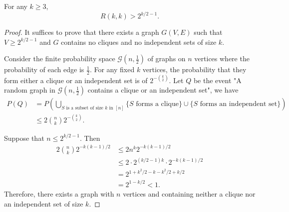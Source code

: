 \begin{theorem}
For any $k\ge 3$, 
$$
R(k,k) > 2^{k/2-1}.
$$
\end{theorem}
\begin{proof}
It suffices to prove that there exists a graph $G(V,E)$ such that $V\ge 2^{k/2-1}$ and $G$ contains no cliques and no independent sets of size $k$. 

Consider the finite probability space $\mathcal{G}\left( n, \frac{1}{2} \right)$ of graphs on $n$ vertices where the probability of each edge is $\frac{1}{2}$. For any fixed $k$ vertices, the probability that they form either a clique or an independent set is of $2^{-\binom{ k}{2}}$. Let $Q$ be the event "A random graph in $\mathcal{G}\left( n, \frac{1}{2} \right)$ contains a clique or an independent set", we have
\begin{align*}
P(Q) & =P\left( \bigcup _{S\text{ is a subset of size }k\text{ in }[n]} \{ S\text{ forms a clique} \}\cup \{ S\text{ forms an independent set} \} \right) \\
 & \le 2\binom{ n}{k } 2^{-\binom{ k}{2 } }.
\end{align*}

Suppose that $n\le 2^{k/2-1}$. Then 
\begin{align*}
2\binom{ n}{k } 2^{-k(k-1)/2} & \le 2n^{k}2^{-k(k-1)/2} \\
 & \le 2\cdot2^{(k/2-1)k}\cdot 2^{-k(k-1)/2} \\
 & =2^{1+k^{2}/2-k-k^{2}/2+k/2} \\
 & =2^{1-k/2}<1. \end{align*}
Therefore, there exists a graph with $n$ vertices and containing neither a clique nor an independent set of size $k$.
\end{proof}

